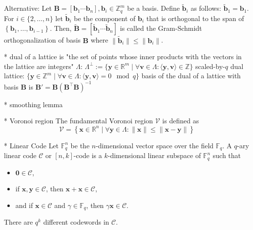 \documentclass[
  a4paper,  %
  twoside,  %
  bibliography=totoc,
  headsepline,
  cleardoublepage=empty,
  parskip=half,
  draft=false
]{scrbook}
\begin{document}
Alternative:
Let $\mathbf{B} = \left[\mathbf{b}_1 \cdots \mathbf{b}_n\right], \mathbf{b}_i \in \mathbb{Z}_q^{m}$ be a basis. Define $\tilde{\mathbf{b}}_i$ as follows: $\tilde{\mathbf{b}}_1 = \mathbf{b}_1$. For $i \in \{2, \ldots, n\}$ let $\tilde{\mathbf{b}}_i$ be the component of $\mathbf{b}_i$ that is orthogonal to the span of $\left\{\mathbf{b}_1, \ldots, \mathbf{b}_{i-1}\right\}$. Then,  $\tilde{\mathbf{B}} = \left[\tilde{\mathbf{b}}_1 \cdots \tilde{\mathbf{b}}_n\right]$ is called the Gram-Schmidt orthogonalization of basis $\mathbf{B}$ where $\| \tilde{\mathbf{b}}_i\| \leq \| \mathbf{b}_i\|$.


* dual of a lattice is "the set of points whose inner products with the vectors in the lattice are integers" $\Lambda$: $\Lambda^{\perp} := \{ \mathbf{y} \in \mathbb{R}^m \mid \forall \mathbf{v} \in \Lambda: \langle \mathbf{y}, \mathbf{v} \rangle \in \mathbb{Z}\}$
scaled-by-$q$ dual lattice:  $\{ \mathbf{y} \in \mathbb{Z}^m \mid \forall \mathbf{v} \in \Lambda: \langle \mathbf{y}, \mathbf{v} \rangle = 0 \mod q\}$ %
basis of the dual of a lattice with basis $\mathbf{B}$ is $\mathbf{B'} = \mathbf{B} (\mathbf{B}^\intercal \mathbf{B})^{-1}$ %

* smoothing lemma

* Voronoi region %
The fundamental Voronoi region $\mathcal{V}$ is defined as
\begin{equation}
  \mathcal{V} = \left\{ \mathbf{x} \in \mathbb{R}^n \mid \forall \mathbf{y} \in \Lambda : \| \mathbf{x} \| \leq \| \mathbf{x} - \mathbf{y} \| \right\}
\end{equation}

* Linear Code \cite{VanLint12} %
Let $\mathbb{F}_q^n$ be the $n$-dimensional vector space over the field $\mathbb{F}_q$. A $q$-ary linear code $\mathcal{C}$ or $[n, k]$-code is a $k$-dimensional linear subspace of $\mathbb{F}_q^n$ such that
\begin{itemize}
  \item $\mathbf{0} \in \mathcal{C}$,
  \item if $\mathbf{x}, \mathbf{y} \in \mathcal{C}$, then $\mathbf{x} + \mathbf{x} \in \mathcal{C}$,
  \item and if $\mathbf{x} \in \mathcal{C}$ and $\gamma \in \mathbb{F}_q$, then $\gamma \mathbf{x} \in \mathcal{C}$.
\end{itemize}
There are $q^k$ different codewords in $\mathcal{C}$.
\end{document}
